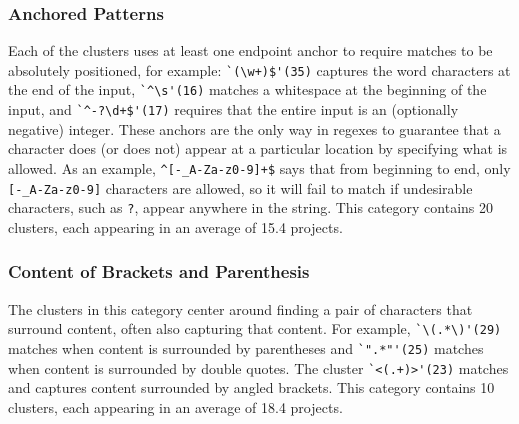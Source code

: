 \subsubsection{Anchored Patterns}
Each of the clusters uses at least one endpoint anchor to require matches to be absolutely positioned, for example:
\verb!`(\w+)$'(35)! captures the word characters at the end of the input, \verb!`^\s'(16)! matches a whitespace at the beginning of the input, and \verb!`^-?\d+$'(17)! requires that the entire input is an (optionally negative) integer.
These anchors are the only way in regexes to guarantee that a character does (or does not) appear at a particular location by specifying what is allowed. As an example, \verb!^[-_A-Za-z0-9]+$! says that from beginning to end, only \verb![-_A-Za-z0-9]! characters are allowed, so it will fail to match if undesirable characters, such as \verb!?!, appear anywhere in the string.
This category contains 20 clusters, each appearing in an average of 15.4 projects.


\subsubsection{Content of Brackets and Parenthesis}
\label{cluster:contentparens}
The clusters in this category center around finding a pair of characters that surround content, often also capturing that content. For example,
\verb!`\(.*\)'(29)! matches when content is surrounded by parentheses and \verb!`".*"'(25)! matches  when content is surrounded by double quotes.  The cluster \verb!`<(.+)>'(23)! matches and captures content surrounded by angled brackets.
This category contains 10 clusters, each appearing in an average of 18.4 projects.
